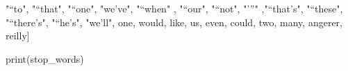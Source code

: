 \documentclass[
  11pt,
  a4paper,
]{article}
\newenvironment{Shaded}{\begin{snugshade}}{\end{snugshade}}
\newcommand{\BuiltInTok}[1]{#1}
\newcommand{\NormalTok}[1]{#1}
\newcommand{\StringTok}[1]{\textcolor[rgb]{0.31,0.60,0.02}{#1}}
\begin{document}
\begin{Shaded}
\begin{Highlighting}[]
  \StringTok{"“to"}\NormalTok{, }\StringTok{"“that"}\NormalTok{, }\StringTok{"“one"}\NormalTok{, }\StringTok{"we’ve"}\NormalTok{, }\StringTok{"“when"}\NormalTok{ , }\StringTok{"“our"}\NormalTok{, }\StringTok{"“not"}\NormalTok{, }\StringTok{"’”"}\NormalTok{ ,}\StringTok{"“that’s"}\NormalTok{, }\StringTok{"“these"}\NormalTok{, }\StringTok{"“there’s"}\NormalTok{, }\StringTok{"“he’s"}\NormalTok{, }\StringTok{"we’ll"}\NormalTok{, }\StringTok{\textquotesingle{}one\textquotesingle{}}\NormalTok{,}
   \StringTok{\textquotesingle{}would\textquotesingle{}}\NormalTok{, }\StringTok{\textquotesingle{}like\textquotesingle{}}\NormalTok{, }\StringTok{\textquotesingle{}us\textquotesingle{}}\NormalTok{, }\StringTok{\textquotesingle{}even\textquotesingle{}}\NormalTok{, }\StringTok{\textquotesingle{}could\textquotesingle{}}\NormalTok{, }\StringTok{\textquotesingle{}two\textquotesingle{}}\NormalTok{, }\StringTok{\textquotesingle{}many\textquotesingle{}}\NormalTok{, }\StringTok{\textquotesingle{}angerer\textquotesingle{}}\NormalTok{, }\StringTok{\textquotesingle{}reilly\textquotesingle{}}\NormalTok{]}
\end{Highlighting}
\end{Shaded}

\begin{Shaded}
\begin{Highlighting}[]
\BuiltInTok{print}\NormalTok{(stop\_words)}
\end{Highlighting}
\end{Shaded}
\end{document}
